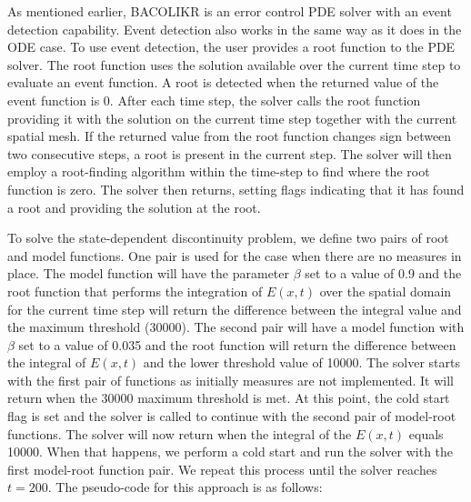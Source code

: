 \documentclass{article}
\begin{document}
As mentioned earlier, BACOLIKR is an error control PDE solver with an event detection capability. Event detection also works in the same way as it does in the ODE case. To use event detection, the user provides a root function to the PDE solver. The root function uses the solution available over the current time step to evaluate an event function. A root is detected when the returned value of the event function is 0. After each time step, the solver calls the root function providing it with the solution on the current time step together with the current spatial mesh. If the returned value from the root function changes sign between two consecutive steps, a root is present in the current step. The solver will then employ a root-finding algorithm within the time-step to find where the root function is zero. The solver then returns, setting flags indicating that it has found a root and providing the solution at the root. 

To solve the state-dependent discontinuity problem, we define two pairs of root and model functions. One pair is used for the case when there are no measures in place. The model function will have the parameter $\beta$ set to a value of 0.9 and the root function that performs the integration of $E(x, t)$ over the spatial domain for the current time step will return the difference between the integral value and the maximum threshold (30000). The second pair will have a model function with $\beta$ set to a value of 0.035 and the root function will return the difference between the integral of $E(x, t)$ and the lower threshold value of 10000. The solver starts with the first pair of functions as initially measures are not implemented. It will return when the 30000 maximum threshold is met. At this point, the cold start flag is set and the solver is called to continue with the second pair of model-root functions. The solver will now return when the integral of the $E(x, t)$ equals 10000. When that happens, we perform a cold start and run the solver with the first model-root function pair. We repeat this process until the solver reaches $t=200$. The pseudo-code for this approach is as follows:
\end{document}
